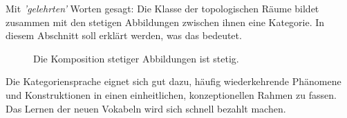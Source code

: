 \documentclass[
12pt, 
openany, 
a4paper, 
final,
fleqn, 
]{myclass}
\numberwithin{equation}{chapter}
\numberwithin{section}{chapter}
\newcommand{\todo}[1]{}
\begin{document}
Mit \emph{’gelehrten’} Worten gesagt: Die Klasse der topologischen Räume bildet zusammen mit den stetigen Abbildungen zwischen ihnen eine Kategorie. In diesem Abschnitt soll erklärt werden, was das bedeutet.

\begin{figure}[h]
\centering
{}
\caption{Die Komposition stetiger Abbildungen ist stetig. \todo{Zeichne diese Abbildung schöner}}
\label{fig:composition}
\end{figure}

Die Kategoriensprache eignet sich gut dazu, häufig wiederkehrende Phänomene und Konstruktionen in einen einheitlichen, konzeptionellen Rahmen zu fassen. Das Lernen der neuen Vokabeln wird sich schnell bezahlt machen.
\end{document}

